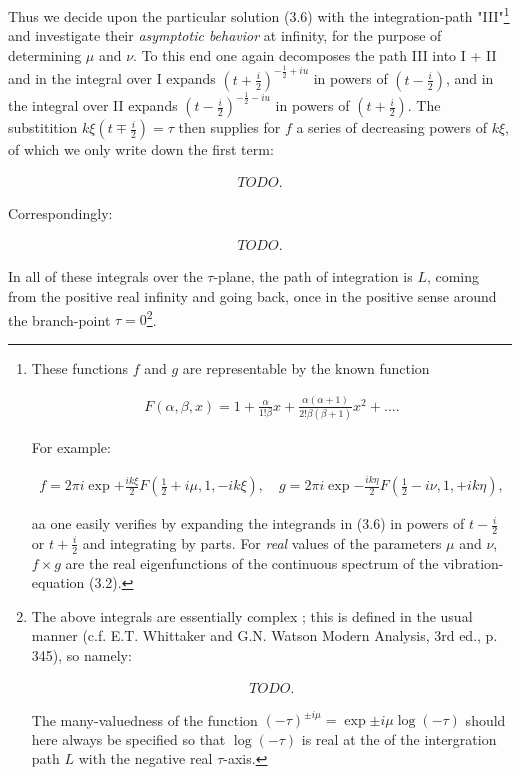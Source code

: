 \documentclass{report}
\newcommand{\nequ}[2]{
\begin{align*}
#1
\tag{#2}
\end{align*}
}
\newcommand{\uequ}[1]{
\begin{align*}
#1
\end{align*}
}
\begin{document}
Thus we decide upon the particular solution (3.6) with the integration-path "III"\footnote{These functions $f$ and $g$ are representable by the known function
\uequ{
F(\alpha, \beta, x) = 1 + \frac{\alpha}{1!\beta}x + \frac{\alpha(\alpha + 1)}{2!\beta(\beta+1)}x^2 + \dots.
}
For example:
\uequ{
f=2\pi i \exp{+\frac{ik\xi}{2}}  F(\frac{1}{2} + i\mu, 1, -ik\xi),\quad
g=2\pi i \exp{-\frac{ik\eta}{2}} F(\frac{1}{2} - i\nu, 1, +ik\eta),
}
aa one easily verifies by expanding the integrands in (3.6) in powers of $t-\frac{i}{2}$ or $t+\frac{i}{2}$ and integrating by parts. For \textit{real} values of the parameters $\mu$ and $\nu$, $f\times g$ are the real eigenfunctions of the continuous spectrum of the vibration-equation (3.2).
} and investigate their \textit{asymptotic behavior} at infinity, for the purpose of determining $\mu$ and $\nu$. To this end one again decomposes the path III into I + II and in the integral over I expands $\left(t+\frac{i}{2}\right)^{-\frac{1}{2} + iu}$ in powers of $\left(t-\frac{i}{2}\right)$, and in the integral over II expands $\left(t-\frac{i}{2}\right)^{-\frac{1}{2} - iu}$ in powers of $\left(t+\frac{i}{2}\right)$. The substitition $k\xi\left(t\mp\frac{i}{2}\right) = \tau$ then supplies for $f$ a series of decreasing powers of $k\xi$, of which we only write down the first term:
\nequ{
TODO.
}{3.8}
Correspondingly:
\nequ{
TODO.
}{3.9}
In all of these integrals over the $\tau$-plane, the path of integration is $L$, coming from the positive real infinity and going back, once in the positive sense around the branch-point $\tau=0$\footnote{The above integrals are essentially complex ; this is defined in the usual manner (c.f. E.T. Whittaker and G.N. Watson Modern Analysis, 3rd ed., p. 345), so namely:
\uequ{
TODO.
}
The many-valuedness of the function $(-\tau)^{\pm i\mu} = \exp{\pm i \mu \log{(-\tau)}}$ should here always be specified so that $\log{(-\tau)}$ is real at the  of the intergration path $L$ with the negative real $\tau$-axis.
}.
\end{document}
